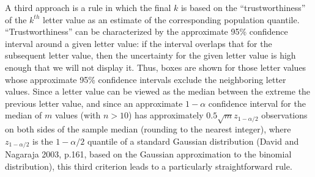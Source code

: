 \documentclass[oneside]{article}
\begin{document}
% 
% 
% 
% 

A third approach is a rule in which the final $k$ is based on 
the ``trustworthiness'' of the $k^{th}$ letter value as an 
estimate of the corresponding population quantile. 
``Trustworthiness'' can be characterized by the %
approximate 95\% confidence interval around a given letter value:
if the interval overlaps that for the subsequent letter value, then 
the uncertainty for the given letter value is high enough that we
will not display it.  Thus, boxes are shown for those
letter values whose approximate 95\% confidence intervals
exclude the neighboring letter values. 
Since a letter value can be viewed as the median between the
extreme the previous letter value, and since an approximate
$1-\alpha$ confidence interval for the median of $m$ values 
(with $n > 10$) has approximately $0.5 \sqrt{m} z_{1-\alpha/2}$ 
observations on both sides of the sample median (rounding to 
the nearest integer), where $z_{1-\alpha/2}$ is the 
${1-\alpha/2}$ quantile of a standard Gaussian distribution 
(David and Nagaraja 2003, p.161, based on the Gaussian
approximation to the binomial distribution), this third
criterion leads to a particularly straightforward rule.
\end{document}
